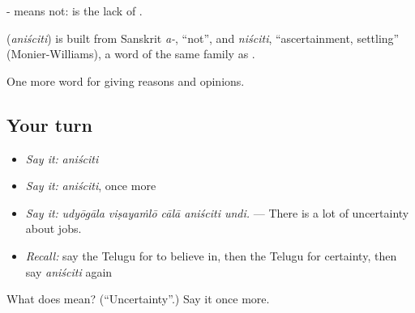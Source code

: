 - means not:  is the lack of .

\begin{cousinweb}
\textbf{} (\emph{aniściti}) is built from Sanskrit \emph{a-}, \textquotedblleft{}not\textquotedblright{}, and \emph{niściti}, \textquotedblleft{}ascertainment, settling\textquotedblright{} (Monier-Williams), a word of the same family as .
\end{cousinweb}

\begin{grammarlens}[title={What you've built}]
One more word for giving reasons and opinions.
\end{grammarlens}

\subsection*{Your turn}
\begin{itemize}
\raggedright
  \item \emph{Say it:} \emph{aniściti}
  \item \emph{Say it:} \emph{aniściti}, once more
  \item \emph{Say it:} \emph{udyōgāla viṣayaṁlō cālā aniściti undi.} — There is a lot of uncertainty about jobs.
  \item \emph{Recall:} say the Telugu for to believe in, then the Telugu for certainty, then say \emph{aniściti} again
\end{itemize}

\begin{tcolorbox}[breakable,colback=teal!4,colframe=teal!35!black,title={Before you move on}]
What does  mean? (\textquotedblleft{}Uncertainty\textquotedblright{}.) Say it once more.
\end{tcolorbox}
